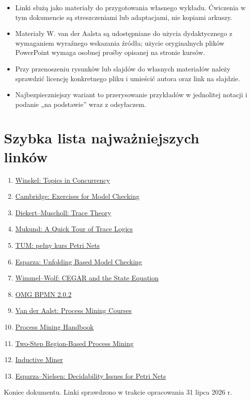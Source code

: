 \documentclass[11pt,a4paper]{article}
\begin{document}
\begin{itemize}
\item Linki służą jako materiały do przygotowania własnego wykładu. Ćwiczenia w tym dokumencie są streszczeniami lub adaptacjami, nie kopiami arkuszy.
\item Materiały W. van der Aalsta są udostępniane do użycia dydaktycznego z wymaganiem wyraźnego wskazania źródła; użycie oryginalnych plików PowerPoint wymaga osobnej prośby opisanej na stronie kursów.
\item Przy przenoszeniu rysunków lub slajdów do własnych materiałów należy sprawdzić licencję konkretnego pliku i umieścić autora oraz link na slajdzie.
\item Najbezpieczniejszy wariant to przerysowanie przykładów w jednolitej notacji i podanie „na podstawie” wraz z odsyłaczem.
\end{itemize}

\section{Szybka lista najważniejszych linków}

\begin{enumerate}
\item \href{https://www.cl.cam.ac.uk/teaching/1617/TopConc/TopicsConc-1617.pdf}{Winskel: Topics in Concurrency}
\item \href{https://www.cl.cam.ac.uk/teaching/2425/HLog+ModC/part2-exercises.pdf}{Cambridge: Exercises for Model Checking}
\item \href{https://www2.informatik.uni-stuttgart.de/fmi/ti/veroeffentlichungen/pdffiles/DiekertMuscholl2011.pdf}{Diekert--Muscholl: Trace Theory}
\item \href{https://www.cmi.ac.in/~madhavan/presentations/arcachon/trace-logic-survey.pdf}{Mukund: A Quick Tour of Trace Logics}
\item \href{https://www.cs.cit.tum.de/tcs/lehre/ss22/petri-nets/}{TUM: pełny kurs Petri Nets}
\item \href{https://teaching.model.in.tum.de/2021ss/petri/material/unfoldings_for_petri_net_course.pdf}{Esparza: Unfolding Based Model Checking}
\item \href{https://lmcs.episciences.org/1036/pdf}{Wimmel--Wolf: CEGAR and the State Equation}
\item \href{https://www.omg.org/spec/BPMN/2.0.2/About-BPMN}{OMG BPMN 2.0.2}
\item \href{https://www.vdaalst.com/courses/courses.html}{Van der Aalst: Process Mining Courses}
\item \href{https://iris.unitn.it/retrieve/eb85cc74-b806-4963-862e-d25d3fdbeeac/978-3-031-08848-3-2.pdf}{Process Mining Handbook}
\item \href{https://www.vdaalst.com/publications/p359.pdf}{Two-Step Region-Based Process Mining}
\item \href{https://leemans.ch/publications/papers/bpi2013leemans.pdf}{Inductive Miner}
\item \href{https://arxiv.org/abs/2411.01592}{Esparza--Nielsen: Decidability Issues for Petri Nets}
\end{enumerate}

\vfill
\begin{center}
\small Koniec dokumentu. Linki sprawdzono w trakcie opracowania 31 lipca 2026 r.
\end{center}
\end{document}
